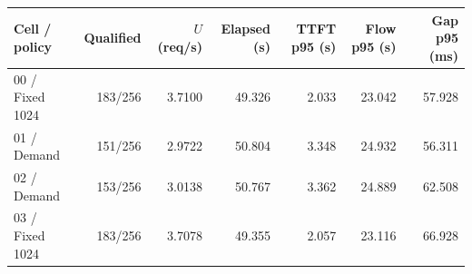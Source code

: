 \begingroup\small\setlength{\tabcolsep}{4pt}
\begin{tabular*}{170mm}{@{\extracolsep{\fill}}lrrrrrr@{}}
\toprule
Cell / policy & Qualified & $U$ (req/s) & Elapsed (s) & TTFT p95 (s) & Flow p95 (s) & Gap p95 (ms) \\
\midrule
00 / Fixed 1024 & 183/256 & 3.7100 & 49.326 & 2.033 & 23.042 & 57.928 \\
01 / Demand & 151/256 & 2.9722 & 50.804 & 3.348 & 24.932 & 56.311 \\
02 / Demand & 153/256 & 3.0138 & 50.767 & 3.362 & 24.889 & 62.508 \\
03 / Fixed 1024 & 183/256 & 3.7078 & 49.355 & 2.057 & 23.116 & 66.928 \\
\bottomrule
\end{tabular*}\par
\endgroup
